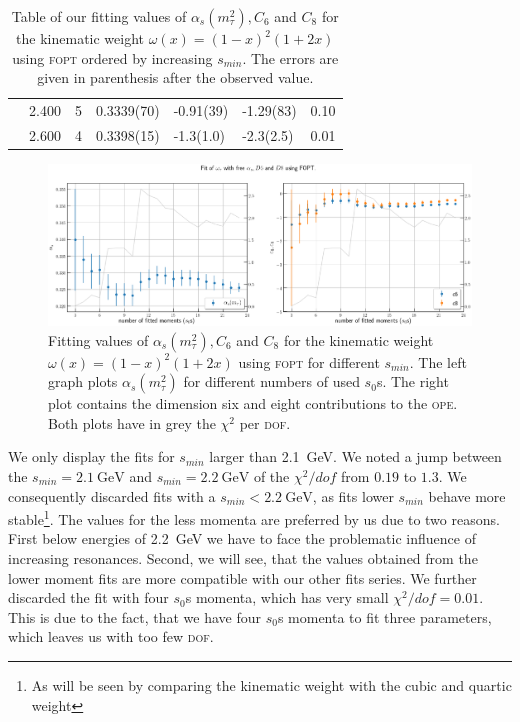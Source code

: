 \documentclass[../../index.tex]{subfiles}
\begin{document}
\begin{table}
\begin{tabularx}{\textwidth}{cccYYYY}
    & 2.400 & 5 & 0.3339(70) & -0.91(39) & -1.29(83) & 0.10 \\
    & 2.600 & 4 & 0.3398(15) & -1.3(1.0) & -2.3(2.5) & 0.01  \\
    \bottomrule
  \end{tabularx}
  \caption{Table of our fitting values of \(\alpha_s(m_\tau^2), C_6\) and
    \(C_8\) for the kinematic weight \(\omega(x)=(1-x)^2(1+2x)\) using
    \textsc{fopt} ordered by increasing \(s_{min}\). The errors are given in
    parenthesis after the observed value.}
  \label{table:fitWKinAlD6D8}
\end{table}
\begin{figure}
  \centering \includegraphics[width=\textwidth]{./images/fitWKinAlD6D8.eps}
  \caption{Fitting values of \(\alpha_s(m_\tau^2), C_6\) and \(C_8\) for the
    kinematic weight \(\omega(x)=(1-x)^2(1+2x)\) using \textsc{fopt} for
    different \(s_{min}\). The left graph plots \(\alpha_s(m_\tau^2)\) for
    different numbers of used \(s_0\)s. The right plot contains the dimension
    six and eight contributions to the \textsc{ope}. Both plots have in grey the
    \(\chi^2\) per \textsc{dof}.}
  \label{fig:fitWKinAlD6D8}
\end{figure}

We only display the fits for \(s_{min}\) larger than \SI{2.1}{\giga\eV}. We
noted a jump between the \(s_{min}=\SI{2.1}{\giga\eV}\) and
\(s_{min}=\SI{2.2}{\giga\eV}\) of the \(\chi^2/dof\) from \(0.19\) to \(1.3\).
We consequently discarded fits with a \(s_{min}<\SI{2.2}{\giga\eV}\), as fits
lower \(s_{min}\) behave more stable\footnote{As will be seen by comparing the
  kinematic weight with the cubic and quartic weight}. The values for the less
momenta are preferred by us due to two reasons. First below energies of
\SI{2.2}{\giga\eV} we have to face the problematic influence of increasing
resonances. Second, we will see, that the values obtained from the lower moment
fits are more compatible with our other fits series. We further discarded the
fit with four \(s_0\)s momenta, which has very small \(\chi^2/dof=0.01\). This
is due to the fact, that we have four \(s_0\)s momenta to fit three parameters,
which leaves us with too few \textsc{dof}.
\end{document}
